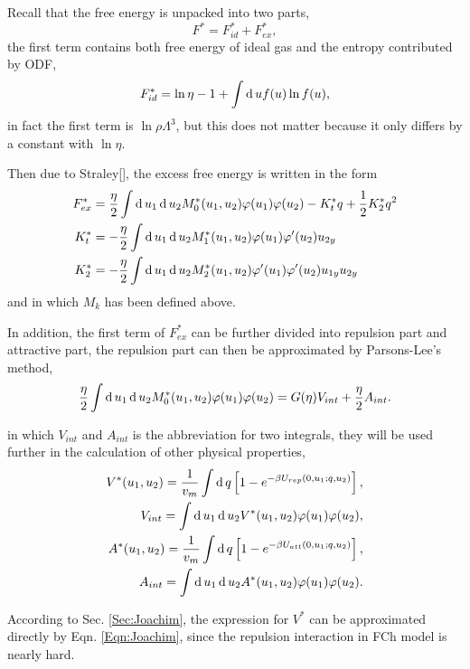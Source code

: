 Recall that the free energy is unpacked into two parts,
\begin{equation}
	F^*=F_{id}^*+F_{ex}^*,
\end{equation}
the first term contains both free energy of ideal gas and the entropy contributed by ODF,
\begin{equation}
	F_{id}^*=\ln\eta-1+\int\operatorname{d}uf(u)\ln f(u),
\end{equation}
in fact the first term is $\ln\rho\Lambda^3$, but this does not matter because it only differs by a constant with $\ln\eta$.

Then due to Straley[], the excess free energy is written in the form
\begin{align}
	F_{ex}^*&=\frac{\eta}{2}\int\operatorname{d}u_1\operatorname{d}u_2M_0^*(u_1,u_2)\varphi(u_1)\varphi(u_2)-K_t^*q+\frac{1}{2}K_2^*q^2\\
	K_t^*&=-\frac{\eta}{2}\int\operatorname{d}u_1\operatorname{d}u_2M_1^*(u_1,u_2)\varphi(u_1)\varphi'(u_2)u_{2y}\\
	K_2^*&=-\frac{\eta}{2}\int\operatorname{d}u_1\operatorname{d}u_2M_2^*(u_1,u_2)\varphi'(u_1)\varphi'(u_2)u_{1y}u_{2y}
\end{align}
and in which $M_k$ has been defined above.

In addition, the first term of $F_{ex}^*$ can be further divided into repulsion part and attractive part, the repulsion part can then be approximated by Parsons-Lee's method,
\begin{equation}
	\frac{\eta}{2}\int\operatorname{d}u_1\operatorname{d}u_2M_0^*(u_1,u_2)\varphi(u_1)\varphi(u_2)=G(\eta)V_{int}+\frac{\eta}{2}A_{int}.
\end{equation}

in which $V_{int}$ and $A_{int}$ is the abbreviation for two integrals, they will be used further in the calculation of other physical properties,
\begin{equation}\label{Eqn:VAstar}
	\begin{split}
		V^*(u_1,u_2)=\frac{1}{v_m}\int\operatorname{d}q\left[1-e^{-\beta U_{rep}(0,u_1;q,u_2)}\right],\\
		V_{int} = \int\operatorname{d}u_1\operatorname{d}u_2V^*(u_1,u_2)\varphi(u_1)\varphi(u_2), \\
		A^*(u_1,u_2)=\frac{1}{v_m}\int\operatorname{d}q\left[1-e^{-\beta U_{att}(0,u_1;q,u_2)}\right],\\
		A_{int}=\int\operatorname{d}u_1\operatorname{d}u_2A^*(u_1,u_2)\varphi(u_1)\varphi(u_2).
	\end{split}
\end{equation}

According to Sec. \ref{Sec:Joachim}, the expression for $V^*$ can be approximated directly by Eqn. \ref{Eqn:Joachim}, since the repulsion interaction in FCh model is nearly hard.

